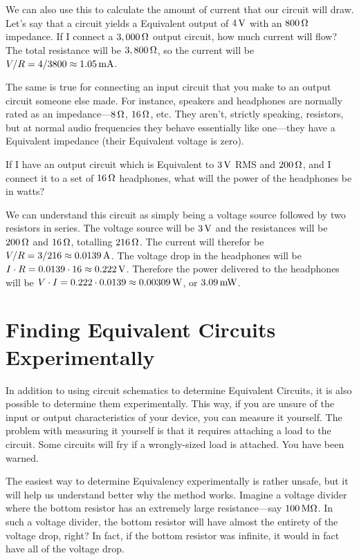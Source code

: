 We can also use this to calculate the amount of current that our circuit will draw.
Let's say that a circuit yields a \thev Equivalent output of $4\,\si{\volt}$ with an $800\,\si{\ohm}$ impedance.
If I connect a $3,000\,\si{\ohm}$ output circuit, how much current will flow?
The total resistance will be $3,800\,\si{\ohm}$, so the current will be $V / R = 4 / 3800 \approx 1.05\,\si{\milli\ampere}$.

The same is true for connecting an input circuit that you make to an output circuit someone else made.
For instance, speakers and headphones are normally rated as an impedance---$8\,\si{\ohm}$, $16\,\si{\ohm}$, etc.
They aren't, strictly speaking, resistors, but at normal audio frequencies they behave essentially like one---they have a \thev Equivalent impedance (their \thev Equivalent voltage is zero).

\begin{exampleprob}
If I have an output circuit which is \thev Equivalent to $3\,\si{\volt}$ RMS and $200\,\si{\ohm}$, and I connect it to a set of $16\,\si{\ohm}$ headphones, what will the power of the headphones be in watts?

We can understand this circuit as simply being a voltage source followed by two resistors in series.
The voltage source will be $3\,\si{\volt}$ and the resistances will be $200\,\si{\ohm}$ and $16\,\si{\ohm}$, totalling $216\,\si{\ohm}$.  
The current will therefor be $V / R = 3 / 216 \approx 0.0139 \,\si{\ampere}$.
The voltage drop in the headphones will be $I \cdot R = 0.0139\cdot 16 \approx 0.222\,\si{\volt}$.
Therefore the power delivered to the headphones will be $V\cdot I = 0.222 \cdot 0.0139 \approx 0.00309\,\si{\watt}$, or $3.09\,\si{\milli\watt}$.
\end{exampleprob}


\section{Finding \thev Equivalent Circuits Experimentally}

In addition to using circuit schematics to determine \thev Equivalent Circuits, it is also possible to determine them experimentally.
This way, if you are unsure of the input or output characteristics of your device, you can measure it yourself.
The problem with measuring it yourself is that it requires attaching a load to the circuit.
Some circuits will fry if a wrongly-sized load is attached.
You have been warned.

The easiest way to determine \thev Equivalency experimentally is rather unsafe, but it will help us understand better why the method works.
Imagine a voltage divider where the bottom resistor has an extremely large resistance---say $100\,\si{\mega\ohm}$.
In such a voltage divider, the bottom resistor will have almost the entirety of the voltage drop, right?
In fact, if the bottom resistor was infinite, it would in fact have all of the voltage drop.

